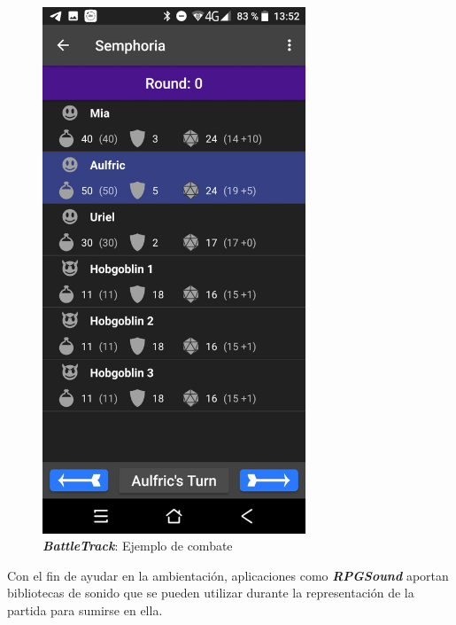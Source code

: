 \begin{figure}[H]
\begin{minipage}{0.3\textwidth}
    \end{minipage} \hspace{2cm}
    \begin{minipage}{0.3\textwidth}
        \centering
        \includegraphics[width=0.7\textwidth]{Images/BattleTrack_2.jpeg}
        \caption{\textit{\textbf{BattleTrack}}: Ejemplo de combate}
        
    \end{minipage}
\end{figure}
\vspace{1cm}

Con el fin de ayudar en la ambientación, aplicaciones como 
\textit{\textbf{RPGSound}} aportan bibliotecas de sonido que se pueden 
utilizar durante la representación de la partida para sumirse en ella.\bigskip


